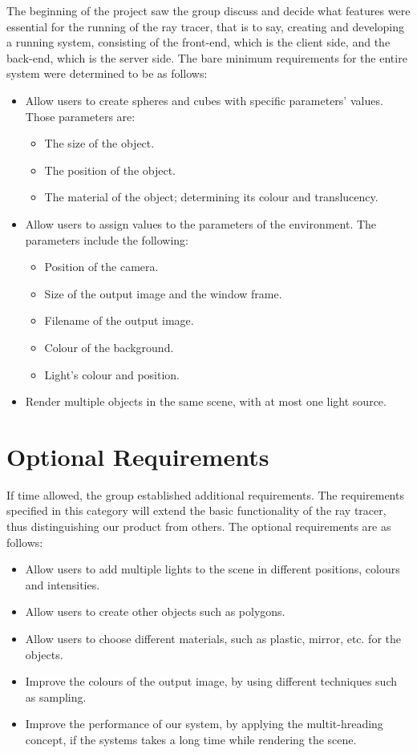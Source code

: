 \documentclass[a4paper]{report}
\begin{document}
	
	The beginning of the project saw the group discuss and decide what features were essential for the running of the ray tracer, that is to say, creating and developing a running system, consisting of the front-end, which is the client side, and the back-end, which is the server side. The bare minimum requirements for the entire system were determined to be as follows:
	\begin{itemize}
		\item Allow users to create spheres and cubes with specific parameters' values. Those parameters are:
		\begin{itemize}
			\item The size of the object.
			\item The position of the object.
			\item The material of the object; determining its colour and translucency.
		\end{itemize}
		\item Allow users to assign values to the parameters of the environment. The parameters include the following:
		\begin{itemize}
			\item Position of the camera.
			\item Size of the output image and the window frame.
			\item Filename of the output image.
			\item Colour of the background.
			\item Light's colour and position.
		\end{itemize}
		\item Render multiple objects in the same scene, with at most one light source.
	\end{itemize}
	
	
	\section{Optional Requirements}
	
	If time allowed, the group established additional requirements.
	The requirements specified in this category will extend the basic functionality of the ray tracer, thus distinguishing our product from others. The optional requirements are as follows:
	\begin{itemize}
		\item Allow users to add multiple lights to the scene in different positions, colours and intensities.
		\item Allow users to create other objects such as polygons.
		\item Allow users to choose different materials, such as plastic, mirror, etc. for the objects.
		\item Improve the colours of the output image, by using different techniques such as sampling.
		\item Improve the performance of our system, by applying the multit-hreading concept, if the systems takes a long time while rendering the scene.
	\end{itemize}
	
\end{document}
